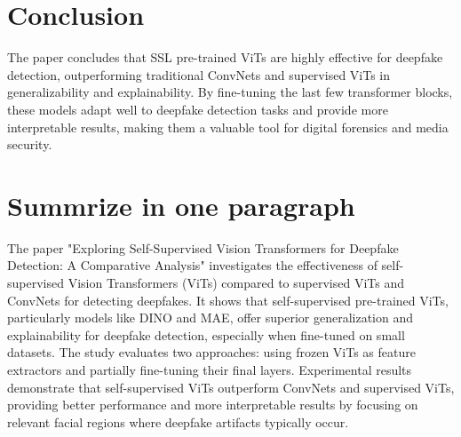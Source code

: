 \documentclass{report}
\begin{document}
	\section{Conclusion}
	The paper concludes that SSL pre-trained ViTs are highly effective for deepfake detection, outperforming traditional ConvNets and supervised ViTs in generalizability and explainability. By fine-tuning the last few transformer blocks, these models adapt well to deepfake detection tasks and provide more interpretable results, making them a valuable tool for digital forensics and media security.
	
	
	\section{Summrize in one paragraph}
	The paper "Exploring Self-Supervised Vision Transformers for Deepfake Detection: A Comparative Analysis" investigates the effectiveness of self-supervised Vision Transformers (ViTs) compared to supervised ViTs and ConvNets for detecting deepfakes. It shows that self-supervised pre-trained ViTs, particularly models like DINO and MAE, offer superior generalization and explainability for deepfake detection, especially when fine-tuned on small datasets. The study evaluates two approaches: using frozen ViTs as feature extractors and partially fine-tuning their final layers. Experimental results demonstrate that self-supervised ViTs outperform ConvNets and supervised ViTs, providing better performance and more interpretable results by focusing on relevant facial regions where deepfake artifacts typically occur.
	
	
	
	
	
	
	
	
	
	
	
	
	
	
	
	
	
	
	
	
	
	
	\newpage
	
	
	
\end{document}
